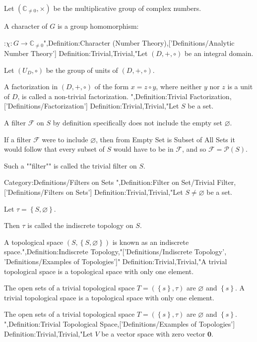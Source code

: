 Let $\left( \mathbb C_{\ne 0}, \times \right)$ be the multiplicative group of complex numbers.


A character of $G$ is a group homomorphism:

:$\chi: G \to \mathbb C_{\ne 0}$",Definition:Character (Number Theory),['Definitions/Analytic Number Theory']
Definition:Trivial,Trivial,"Let $\left( D, +, \circ \right)$ be an integral domain.

Let $\left( U_D, \circ \right)$ be the group of units of $\left( D, +, \circ \right)$.


A factorization in $\left( D, +, \circ \right)$ of the form $x = z \circ y$, where neither $y$ nor $z$ is a unit of $D$, is called a non-trivial factorization.
",Definition:Trivial Factorization,['Definitions/Factorization']
Definition:Trivial,Trivial,"Let $S$ be a set.


A filter $\mathcal F$ on $S$ by definition specifically does not include the empty set $\varnothing$.

If a filter $\mathcal F$ were to include $\varnothing$, then from Empty Set is Subset of All Sets it would follow that every subset of $S$ would have to be in $\mathcal F$, and so $\mathcal F = \mathcal P \left( S \right)$.


Such a ""filter"" is called the trivial filter on $S$.


Category:Definitions/Filters on Sets
",Definition:Filter on Set/Trivial Filter,['Definitions/Filters on Sets']
Definition:Trivial,Trivial,"Let $S \ne \varnothing$ be a set.

Let $\tau = \left\lbrace S, \varnothing \right\rbrace$.


Then $\tau$ is called the indiscrete topology on $S$.


A topological space $\left( S, \left\lbrace S, \varnothing \right\rbrace  \right)$ is known as an indiscrete space.",Definition:Indiscrete Topology,"['Definitions/Indiscrete Topology', 'Definitions/Examples of Topologies']"
Definition:Trivial,Trivial,"A trivial topological space is a topological space with only one element.


The open sets of a trivial topological space $T = \left( \left\lbrace s \right\rbrace, \tau \right)$ are $\varnothing$ and $\left\lbrace s \right\rbrace$.
A trivial topological space is a topological space with only one element.


The open sets of a trivial topological space $T = \left( \left\lbrace s \right\rbrace, \tau \right)$ are $\varnothing$ and $\left\lbrace s \right\rbrace$.
",Definition:Trivial Topological Space,['Definitions/Examples of Topologies']
Definition:Trivial,Trivial,"Let $V$ be a vector space with zero vector $\mathbf 0$.


